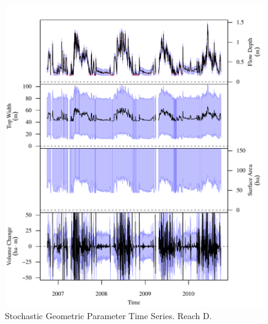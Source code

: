 \begin{figure}[htbp]
\begin{center}
	\includegraphics[width=5.5in]{"Figures/Results_USR/G TS D"}
	\caption{Stochastic Geometric Parameter Time Series.  Reach D.}
\end{center}
\end{figure}
\newpage

